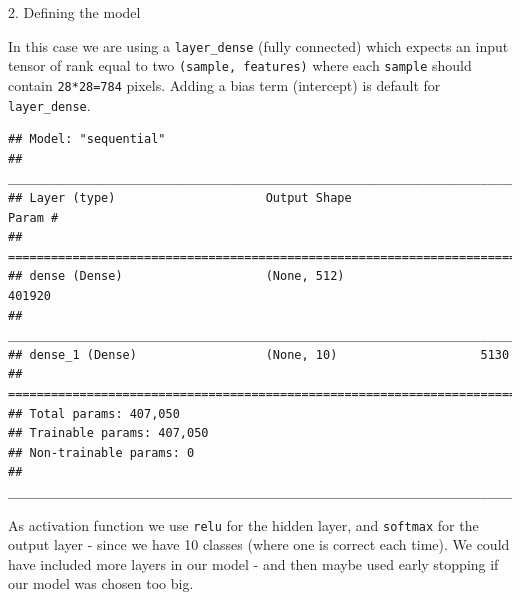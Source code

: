 \documentclass[10pt,ignorenonframetext,]{beamer}
\newenvironment{Shaded}{\begin{snugshade}}{\end{snugshade}}
\newcommand{\KeywordTok}[1]{\textcolor[rgb]{0.13,0.29,0.53}{\textbf{#1}}}
\newcommand{\DataTypeTok}[1]{\textcolor[rgb]{0.13,0.29,0.53}{#1}}
\newcommand{\DecValTok}[1]{\textcolor[rgb]{0.00,0.00,0.81}{#1}}
\newcommand{\StringTok}[1]{\textcolor[rgb]{0.31,0.60,0.02}{#1}}
\newcommand{\OperatorTok}[1]{\textcolor[rgb]{0.81,0.36,0.00}{\textbf{#1}}}
\newcommand{\NormalTok}[1]{#1}
\begin{document}
\begin{frame}[fragile]

\begin{block}{2. Defining the model}

In this case we are using a \texttt{layer\_dense} (fully connected)
which expects an input tensor of rank equal to two
\texttt{(sample,\ features)} where each \texttt{sample} should contain
\texttt{28*28=784} pixels. Adding a bias term (intercept) is default for
\texttt{layer\_dense}.

\begin{Shaded}
\end{Shaded}

\begin{verbatim}
## Model: "sequential"
## ___________________________________________________________________________
## Layer (type)                     Output Shape                  Param #     
## ===========================================================================
## dense (Dense)                    (None, 512)                   401920      
## ___________________________________________________________________________
## dense_1 (Dense)                  (None, 10)                    5130        
## ===========================================================================
## Total params: 407,050
## Trainable params: 407,050
## Non-trainable params: 0
## ___________________________________________________________________________
\end{verbatim}

As activation function we use \texttt{relu} for the hidden layer, and
\texttt{softmax} for the output layer - since we have 10 classes (where
one is correct each time). We could have included more layers in our
model - and then maybe used early stopping if our model was chosen too
big.

\end{block}

\end{frame}
\end{document}
